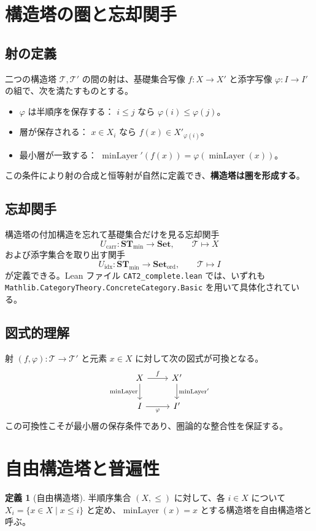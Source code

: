 \documentclass[a4paper]{ltjsarticle}
\theoremstyle{definition}
\newtheorem{definition}{定義}[section]
\theoremstyle{plain}
\theoremstyle{remark}
\begin{document}
\section{構造塔の圏と忘却関手}

\subsection{射の定義}
二つの構造塔 $\mathcal{T},\mathcal{T}'$ の間の射は、基礎集合写像 $f \colon X \to X'$ と添字写像 $\varphi \colon I\to I'$ の組で、次を満たすものとする。
\begin{itemize}
  \item $\varphi$ は半順序を保存する： $i\leq j$ なら $\varphi(i)\leq \varphi(j)$。
  \item 層が保存される： $x\in X_i$ なら $f(x)\in X'_{\varphi(i)}$。
  \item 最小層が一致する： $\operatorname{minLayer}'(f(x)) = \varphi(\operatorname{minLayer}(x))$。
\end{itemize}
この条件により射の合成と恒等射が自然に定義でき、\textbf{構造塔は圏を形成する}。

\subsection{忘却関手}
構造塔の付加構造を忘れて基礎集合だけを見る忘却関手
\[
  U_\mathrm{carr} \colon \mathbf{ST}_{\min} \to \mathbf{Set},\qquad
  \mathcal{T} \mapsto X
\]
および添字集合を取り出す関手
\[
  U_\mathrm{idx} \colon \mathbf{ST}_{\min} \to \mathbf{Set}_{\operatorname{ord}},\qquad
  \mathcal{T} \mapsto I
\]
が定義できる。Lean ファイル \texttt{CAT2\_complete.lean} では、いずれも \texttt{Mathlib.CategoryTheory.ConcreteCategory.Basic} を用いて具体化されている。

\subsection{図式的理解}
射 $(f,\varphi)\colon \mathcal{T}\to \mathcal{T}'$ と元素 $x\in X$ に対して次の図式が可換となる。
\[
\begin{tikzcd}
X \arrow[d, "\operatorname{minLayer}"'] \arrow[r, "f"] & X' \arrow[d, "\operatorname{minLayer}'"] \\
I \arrow[r, "\varphi"'] & I'
\end{tikzcd}
\]
この可換性こそが最小層の保存条件であり、圏論的な整合性を保証する。

\section{自由構造塔と普遍性}
\begin{definition}[自由構造塔]
半順序集合 $(X,\leq)$ に対して、各 $i\in X$ について $X_i=\{x\in X \mid x\leq i\}$ と定め、$\operatorname{minLayer}(x)=x$ とする構造塔を自由構造塔と呼ぶ。
\end{definition}
\end{document}
